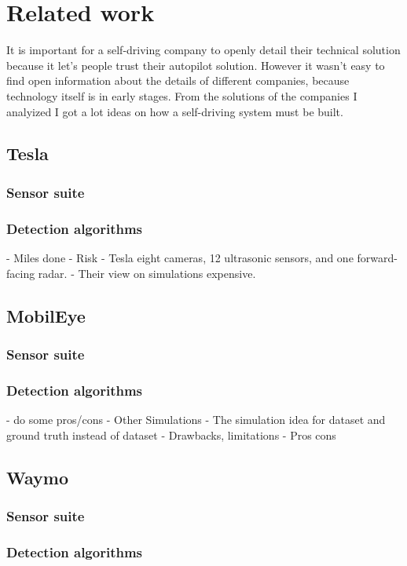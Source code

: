 \chapter{Related work}
\label{chap:relatedwork}

It is important for a self-driving company to openly detail their technical
solution because it let's people trust their autopilot solution. However it
wasn't easy to find open information about the details of different companies,
because technology itself is in early stages. From the solutions of the
companies I analyized I got a lot ideas on how a self-driving system must be built. 

\section{Tesla}

\subsection{Sensor suite}

\subsection{Detection algorithms}
- Miles done
- Risk
- Tesla  eight cameras, 12 ultrasonic sensors, and one forward-facing radar.
  - Their view on simulations
expensive.
\section{MobilEye}

\subsection{Sensor suite}

\subsection{Detection algorithms}

  -  do some pros/cons
- Other Simulations
- The simulation idea for dataset and ground truth instead of dataset
  - Drawbacks, limitations
  - Pros cons



\section{Waymo}

\subsection{Sensor suite}

\subsection{Detection algorithms}
